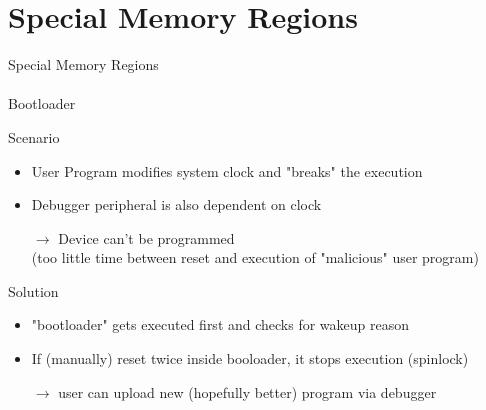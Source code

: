 \documentclass[aspectratio=169]{CPS-Beamer}
\begin{document}
\section{Special Memory Regions}
\begin{frame}{Special Memory Regions\\~\\Bootloader}
	\begin{block}{Scenario}
		\begin{itemize}
			\item User Program modifies system clock and "breaks" the execution
			\item Debugger peripheral is also dependent on clock
			\item[$\rightarrow$] Device can't be programmed\\(too little time between reset and execution of "malicious" user program)
		\end{itemize}
	\end{block}
	\begin{block}{Solution}
	\begin{itemize}
		\item "bootloader" gets executed first and checks for wakeup reason
		\item If (manually) reset twice inside booloader, it stops execution (spinlock)
		\item[$\rightarrow$] user can upload new (hopefully better) program via debugger
	\end{itemize}
\end{block}
\end{frame}
\end{document}

